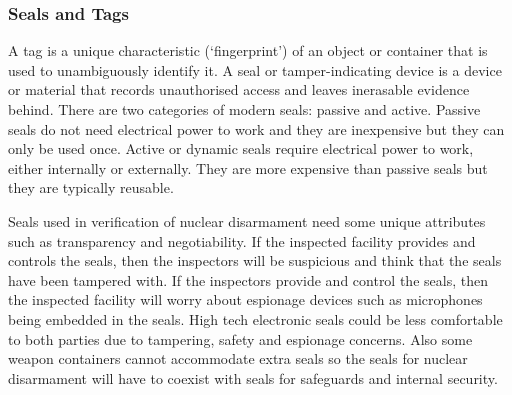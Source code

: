 \documentclass[twoside,titlepage,11pt,twocolumn,a4paper]{article}
\begin{document}
\subsubsection{Seals and Tags}
A tag is a unique characteristic (`fingerprint') of an object or
container that is used to unambiguously identify it. A seal or
tamper-indicating device is a device or material that records
unauthorised access and leaves inerasable evidence behind. There are
two categories of modern seals: passive and active. Passive seals do
not need electrical power to work and they are inexpensive but they
can only be used once. Active or dynamic seals require electrical
power to work, either internally or externally. They are more
expensive than passive seals but they are typically reusable.
\citep{nuclearTamperSeals2001}

Seals used in verification of nuclear disarmament need some unique
attributes such as transparency and negotiability. If the inspected
facility provides and controls the seals, then the inspectors will be
suspicious and think that the seals have been tampered with. If the
inspectors provide and control the seals, then the inspected facility
will worry about espionage devices such as microphones being embedded
in the seals. High tech electronic seals could be less comfortable to
both parties due to tampering, safety and espionage concerns. Also
some weapon containers cannot accommodate extra seals so the seals for
nuclear disarmament will have to coexist with seals for safeguards and
internal security. \citep{nuclearTamperSeals2001}
\end{document}
